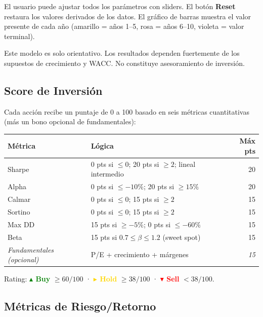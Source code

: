 \documentclass[11pt, a4paper]{article}
\begin{document}
El usuario puede ajustar todos los parámetros con sliders. El botón \textbf{Reset} restaura los valores derivados de los datos. El gráfico de barras muestra el valor presente de cada año (amarillo = años 1--5, rosa = años 6--10, violeta = valor terminal).

\begin{warningbox}
  Este modelo es solo orientativo. Los resultados dependen fuertemente de los supuestos de crecimiento y WACC. No constituye asesoramiento de inversión.
\end{warningbox}

\subsection{Score de Inversión}

Cada acción recibe un puntaje de 0 a 100 basado en seis métricas cuantitativas (más un bono opcional de fundamentales):

\begin{center}
\begin{tabular}{llr}
  \toprule
  \textbf{Métrica} & \textbf{Lógica} & \textbf{Máx pts} \\
  \midrule
  Sharpe  & 0 pts si $\leq 0$; 20 pts si $\geq 2$; lineal intermedio & 20 \\
  Alpha   & 0 pts si $\leq -10\%$; 20 pts si $\geq 15\%$ & 20 \\
  Calmar  & 0 pts si $\leq 0$; 15 pts si $\geq 2$ & 15 \\
  Sortino & 0 pts si $\leq 0$; 15 pts si $\geq 2$ & 15 \\
  Max DD  & 15 pts si $\geq -5\%$; 0 pts si $\leq -60\%$ & 15 \\
  Beta    & 15 pts si $0.7 \leq \beta \leq 1.2$ (sweet spot) & 15 \\
  \midrule
  \textit{Fundamentales (opcional)} & P/E + crecimiento + márgenes & \textit{15} \\
  \bottomrule
\end{tabular}
\end{center}

Rating: \textbf{\textcolor{green}{$\blacktriangle$ Buy}} $\geq 60/100$ · \textbf{\textcolor{gold}{$\blacktriangleright$ Hold}} $\geq 38/100$ · \textbf{\textcolor{red}{$\blacktriangledown$ Sell}} $< 38/100$.

\subsection{Métricas de Riesgo/Retorno}
\end{document}
